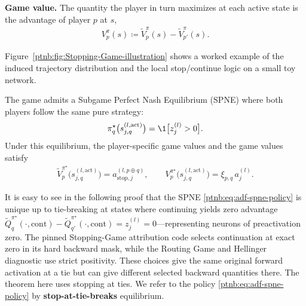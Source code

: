 \begin{definition}
\textbf{Game value.} The quantity the player in turn maximizes at each active state is the
advantage of player $p$ at $s$,
\begin{align}\label{ptnb:eq:adf-advantage}
    V_p^\pi(s) \coloneqq \tilde{V}_p^\pi(s) - \tilde{V}_{p'}^\pi(s).
\end{align}
\end{definition}

Figure~\ref{ptnb:fig:Stopping-Game-illustration} shows a worked example of the induced trajectory
distribution and the local stop/continue logic on a small toy network.

\begin{theoremenv}\label{ptnb:thm:forward-stopping}
The game admits a Subgame Perfect Nash Equilibrium (SPNE) where both players follow the same pure
strategy:
\begin{align} \label{ptnb:eq:adf-spne-policy}
    \pi_q^{\star}\bigl(s_{j,q}^{(l, \mathrm{act})}\bigr) = \1\bigl[z_j^{(l)} > 0\bigr].
\end{align}
Under this equilibrium, the player-specific game values and the game values satisfy
\begin{align}\label{ptnb:eq:adf-spne-values}
    \tilde{V}_p^{\pi^\star}\bigl(s_{j,q}^{(l, \mathrm{act})}\bigr) = a_{\mathrm{stop},j}^{(l, p \oplus
    q)},
    \qquad
    V_p^{\pi^\star}\bigl(s_{j,q}^{(l, \mathrm{act})}\bigr) = \xi_{p,q}\, a_j^{(l)}.
\end{align}
\hfill{}
\end{theoremenv}

\begin{remark} \label{ptnb:rem:adf-spne-uniqueness}
It is easy to see in the following proof that the SPNE \eqref{ptnb:eq:adf-spne-policy} is unique up to
tie-breaking at states where continuing yields zero advantage $\tilde
    Q_q^{\pi^\star}(\cdot,\mathrm{cont})-\tilde Q_{q'}^{\pi^\star}(\cdot,\mathrm{cont}) = z_j^{(l)} =
    0$---representing neurons of preactivation zero. The pinned Stopping-Game attribution code selects continuation at exact zero in its hard backward mask, while the Routing Game and Hellinger diagnostic use strict positivity. These choices give the same original forward activation at a tie but can give different selected backward quantities there. The theorem here uses stopping at ties. We refer to the policy
\eqref{ptnb:eq:adf-spne-policy} by \textbf{stop-at-tie-breaks} equilibrium.
\end{remark}

